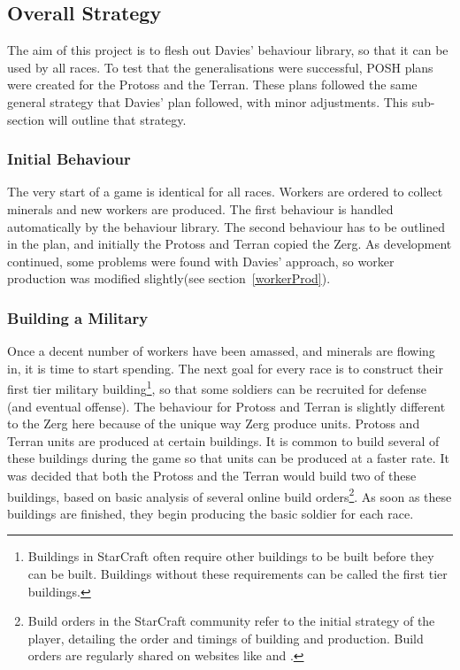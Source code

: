 \documentclass[11pt,openright,a4paper]{report}
\begin{document}
\subsection{Overall Strategy}
The aim of this project is to flesh out Davies' behaviour library, so that it can be used by all races. To test that the generalisations were successful, POSH plans were created for the Protoss and the Terran. These plans followed the same general strategy that Davies' plan followed, with minor adjustments. This sub-section will outline that strategy.

\subsubsection{Initial Behaviour}
The very start of a game is identical for all races. Workers are ordered to collect minerals and new workers are produced. The first behaviour is handled automatically by the behaviour library. The second behaviour has to be outlined in the plan, and initially the Protoss and Terran copied the Zerg. As development continued, some problems were found with Davies' approach, so worker production was modified slightly(see section~\ref{workerProd}).

\subsubsection{Building a Military}
Once a decent number of workers have been amassed, and minerals are flowing in, it is time to start spending. The next goal for every race is to construct their first tier military building\footnote{Buildings in StarCraft often require other buildings to be built before they can be built. Buildings without these requirements can be called the first tier buildings.}, so that some soldiers can be recruited for defense (and eventual offense). The behaviour for Protoss and Terran is slightly different to the Zerg here because of the unique way Zerg produce units. Protoss and Terran units are produced at certain buildings. It is common to build several of these buildings during the game so that units can be produced at a faster rate. It was decided that both the Protoss and the Terran would build two of these buildings, based on basic analysis of several online build orders\footnote{Build orders in the StarCraft community refer to the initial strategy of the player, detailing the order and timings of building and production. Build orders are regularly shared on websites like  and .}. As soon as these buildings are finished, they begin producing the basic soldier for each race.
\end{document}

